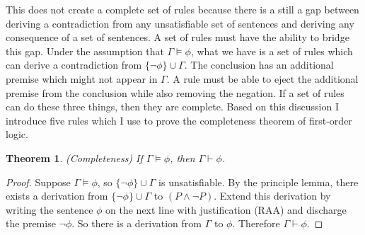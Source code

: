 \documentclass[12pt]{article}
\newtheorem{theorem}{Theorem}[section]
\theoremstyle{definition}
\theoremstyle{remark}
\begin{document}
This does not create a complete set of rules because there is a still a gap between deriving a contradiction from any unsatisfiable set of sentences and deriving any consequence of a set of sentences. A set of rules must have the ability to bridge this gap. Under the assumption that $\Gamma \models \phi$, what we have is a set of rules which can derive a contradiction from $\{ \neg\phi \} \cup \Gamma$. The conclusion has an additional premise which might not appear in $\Gamma$. A rule must be able to eject the additional premise from the conclusion while also removing the negation. If a set of rules can do these three things, then they are complete. Based on this discussion I introduce five rules which I use to prove the completeness theorem of first-order logic.

\begin{theorem}{\textnormal{(Completeness)}}
	If $\Gamma \models \phi$, then $\Gamma \vdash \phi$. 
\end{theorem}

\begin{proof}
	Suppose $\Gamma \models \phi$, so $\{ \neg\phi \} \cup \Gamma$ is unsatisfiable. By the principle lemma, there exists a derivation from $\{ \neg\phi \} \cup \Gamma$ to $(P \land \neg P)$. Extend this derivation by writing the sentence $\phi$ on the next line with justification (RAA) and discharge the premise $\neg\phi$. So there is a derivation from $\Gamma$ to $\phi$. Therefore $\Gamma \vdash \phi$.
\end{proof}
\end{document}
